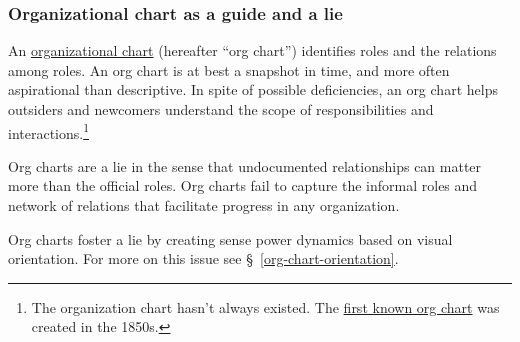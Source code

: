 \subsubsection*{Organizational chart as a guide and a lie}

An \href{https://en.wikipedia.org/wiki/Organizational_chart}{organizational chart} (hereafter ``org chart'') identifies roles and the relations among roles. An org chart is at best a snapshot in time, and more often aspirational than descriptive. In spite of possible deficiencies, an org chart helps outsiders and newcomers understand the scope of responsibilities and interactions.\footnote{The organization chart hasn't always existed. The \href{https://en.wikipedia.org/wiki/George_Holt_Henshaw\#First_organization_chart}{first known org chart} was created in the 1850s.}

Org charts are a lie in the sense that undocumented relationships can matter more than the official roles. Org charts fail to capture the informal roles and network of relations that facilitate progress in any organization. 

Org charts foster a lie by creating sense power dynamics based on visual orientation. For more on this issue see \S~\ref{org-chart-orientation}.
